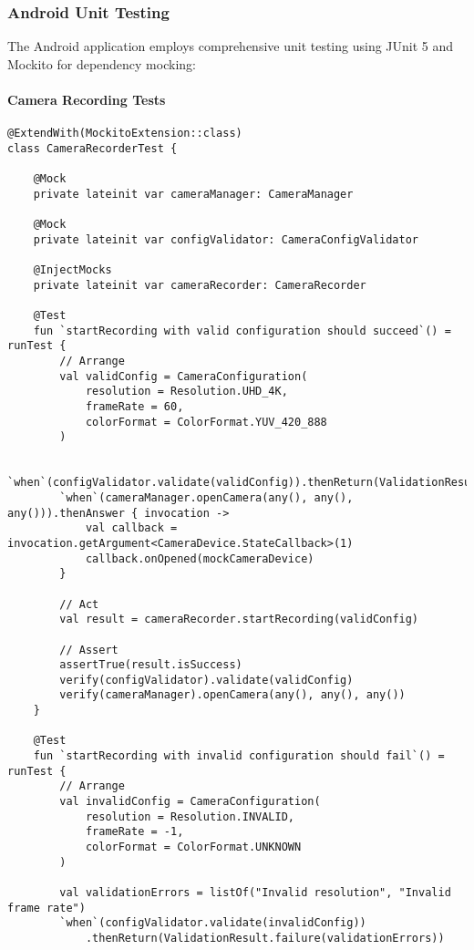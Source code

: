 \documentclass[12pt,a4paper]{article}
\begin{document}
\subsubsection{Android Unit Testing}

The Android application employs comprehensive unit testing using JUnit 5 and Mockito for dependency mocking:

\paragraph{Camera Recording Tests}

\begin{verbatim}
@ExtendWith(MockitoExtension::class)
class CameraRecorderTest {
    
    @Mock
    private lateinit var cameraManager: CameraManager
    
    @Mock
    private lateinit var configValidator: CameraConfigValidator
    
    @InjectMocks
    private lateinit var cameraRecorder: CameraRecorder
    
    @Test
    fun `startRecording with valid configuration should succeed`() = runTest {
        // Arrange
        val validConfig = CameraConfiguration(
            resolution = Resolution.UHD_4K,
            frameRate = 60,
            colorFormat = ColorFormat.YUV_420_888
        )
        
        `when`(configValidator.validate(validConfig)).thenReturn(ValidationResult.success())
        `when`(cameraManager.openCamera(any(), any(), any())).thenAnswer { invocation ->
            val callback = invocation.getArgument<CameraDevice.StateCallback>(1)
            callback.onOpened(mockCameraDevice)
        }
        
        // Act
        val result = cameraRecorder.startRecording(validConfig)
        
        // Assert
        assertTrue(result.isSuccess)
        verify(configValidator).validate(validConfig)
        verify(cameraManager).openCamera(any(), any(), any())
    }
    
    @Test
    fun `startRecording with invalid configuration should fail`() = runTest {
        // Arrange
        val invalidConfig = CameraConfiguration(
            resolution = Resolution.INVALID,
            frameRate = -1,
            colorFormat = ColorFormat.UNKNOWN
        )
        
        val validationErrors = listOf("Invalid resolution", "Invalid frame rate")
        `when`(configValidator.validate(invalidConfig))
            .thenReturn(ValidationResult.failure(validationErrors))
        

\end{verbatim}
\end{document}
